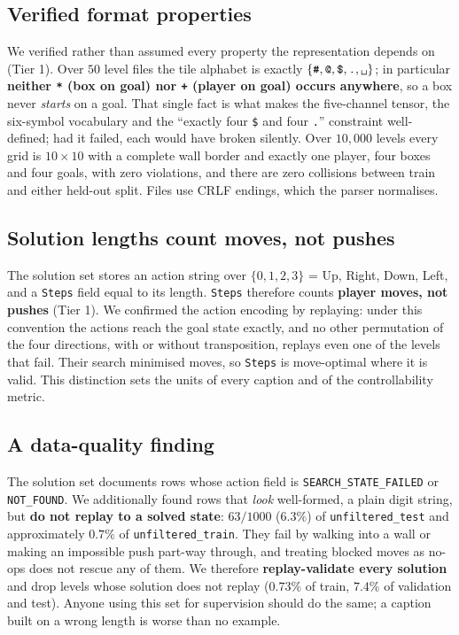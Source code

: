 \documentclass[conference]{IEEEtran}
\begin{document}
\subsection{Verified format properties}
We verified rather than assumed every property the representation depends on
(Tier 1). Over $50$ level files the tile alphabet is exactly
$\{\texttt{\#}, \texttt{@}, \texttt{\$}, \texttt{.}, \texttt{\textvisiblespace}\}$;
in particular \textbf{neither \texttt{*} (box on goal) nor \texttt{+} (player on
goal) occurs anywhere}, so a box never \emph{starts} on a goal. That single fact
is what makes the five-channel tensor, the six-symbol vocabulary and the
``exactly four \texttt{\$} and four \texttt{.}'' constraint well-defined; had it
failed, each would have broken silently. Over $10{,}000$ levels every grid is
$10\times10$ with a complete wall border and exactly one player, four boxes and
four goals, with zero violations, and there are zero collisions between train
and either held-out split. Files use CRLF endings, which the parser
normalises.

\subsection{Solution lengths count moves, not pushes}
The solution set stores an action string over $\{0,1,2,3\}$ = Up, Right, Down,
Left, and a \texttt{Steps} field equal to its length. \texttt{Steps} therefore
counts \textbf{player moves, not pushes} (Tier 1). We confirmed the action
encoding by replaying: under this convention the actions reach the goal state
exactly, and no other permutation of the four directions, with or without
transposition, replays even one of the levels that fail. Their search minimised
moves, so \texttt{Steps} is move-optimal where it is valid. This distinction
sets the units of every caption and of the controllability metric.

\subsection{A data-quality finding}
The solution set documents rows whose action field is
\texttt{SEARCH\_STATE\_FAILED} or \texttt{NOT\_FOUND}. We additionally found rows
that \emph{look} well-formed, a plain digit string, but \textbf{do not
replay to a solved state}: $63/1000$ ($6.3\%$) of \texttt{unfiltered\_test} and
approximately $0.7\%$ of \texttt{unfiltered\_train}. They fail by walking into a
wall or making an impossible push part-way through, and treating blocked moves
as no-ops does not rescue any of them. We therefore \textbf{replay-validate
every solution} and drop levels whose solution does not replay ($0.73\%$ of
train, $7.4\%$ of validation and test). Anyone using this set for supervision
should do the same; a caption built on a wrong length is worse than no example.
\end{document}

